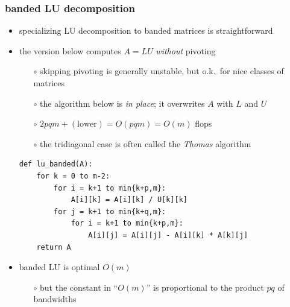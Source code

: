 \documentclass[10pt,
               svgnames,
               hyperref={colorlinks,citecolor=DeepPink4,linkcolor=FireBrick,urlcolor=Maroon},
               usepdftitle=false]{beamer}
\begin{document}
\begin{frame}[fragile]
\frametitle{banded LU decomposition}

\begin{itemize}
\item specializing LU decomposition to banded matrices is straightforward
\item the version below computes $A=LU$ \emph{without} pivoting
   \begin{itemize}
   \item[$\circ$] skipping pivoting is generally unstable, but o.k.~for nice classes of matrices 
   \item[$\circ$] the algorithm below is \emph{in place}; it overwrites $A$ with $L$ and $U$
   \item[$\circ$] $2pqm + (\text{lower}) = O(pqm) = O(m)$ flops
   \item[$\circ$] the tridiagonal case is often called the \emph{Thomas} algorithm
   \end{itemize}

\medskip
\begin{center}
\begin{minipage}{0.8\textwidth}
\begin{verbatim}
def lu_banded(A):
    for k = 0 to m-2:
        for i = k+1 to min{k+p,m}:
            A[i][k] = A[i][k] / U[k][k]
        for j = k+1 to min{k+q,m}:
            for i = k+1 to min{k+p,m}:
                A[i][j] = A[i][j] - A[i][k] * A[k][j]
    return A
\end{verbatim}
\end{minipage}
\end{center}

\bigskip
\item banded LU is optimal $O(m)$
   \begin{itemize}
   \item[$\circ$] but the constant in ``$O(m)$'' is proportional to the product $pq$ of bandwidths
   \end{itemize}
\end{itemize}
\end{frame}
\end{document}
